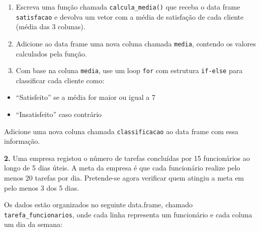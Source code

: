 \documentclass[
]{book}
\providecommand{\tightlist}{%
  \setlength{\itemsep}{0pt}\setlength{\parskip}{0pt}}
\begin{document}
\begin{enumerate}
\def\labelenumi{(\alph{enumi})}
\item
  Escreva uma função chamada \texttt{calcula\_media()} que receba o data frame \texttt{satisfacao} e devolva um vetor com a média de satisfação de cada cliente (média das 3 colunas).
\item
  Adicione ao data frame uma nova coluna chamada \texttt{media}, contendo os valores calculados pela função.
\item
  Com base na coluna \texttt{media}, use um loop \texttt{for} com estrutura \texttt{if-else} para classificar cada cliente como:
\end{enumerate}

\begin{itemize}
\tightlist
\item
  ``Satisfeito'' se a média for maior ou igual a 7
\item
  ``Insatisfeito'' caso contrário
\end{itemize}

Adicione uma nova coluna chamada \texttt{classificacao} ao data frame com essa informação.

\textbf{2.} Uma empresa registou o número de tarefas concluídas por 15 funcionários ao longo de 5 dias úteis. A meta da empresa é que cada funcionário realize pelo menos 20 tarefas por dia. Pretende-se agora verificar quem atingiu a meta em pelo menos 3 dos 5 dias.

Os dados estão organizados no seguinte data.frame, chamado \texttt{tarefa\_funcionarios}, onde cada linha representa um funcionário e cada coluna um dia da semana:
\end{document}
